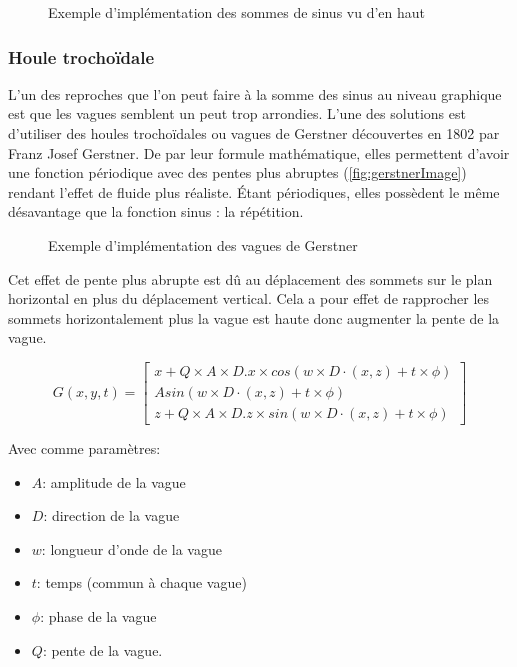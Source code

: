 \begin{figure}[H]			
	\caption{Exemple d'implémentation des sommes de sinus vu d'en haut}
	\label{fig:sumOfSineImage2}
\end{figure}
\pagebreak
\subsubsection{Houle trochoïdale}
L'un des reproches que l'on peut faire à la somme des sinus au niveau graphique est que les vagues semblent un peut trop arrondies. L'une des solutions est d'utiliser des houles trochoïdales ou vagues de Gerstner découvertes en 1802 par Franz Josef Gerstner\citep{gerstner}. De par leur formule mathématique, elles permettent d'avoir une fonction périodique avec des pentes plus abruptes (\autoref{fig:gerstnerImage}) rendant l'effet de fluide plus réaliste. Étant périodiques, elles possèdent le même désavantage que la fonction sinus : la répétition.

\begin{figure}[H]			
	\caption{Exemple d'implémentation des vagues de Gerstner}
	\label{fig:gerstnerImage}
\end{figure}

Cet effet de pente plus abrupte est dû au déplacement des sommets sur le plan horizontal en plus du déplacement vertical. Cela a pour effet de rapprocher les sommets horizontalement plus la vague est haute donc augmenter la pente de la vague.

\[G(x,y,t) =\begin{bmatrix}
	x + Q \times A \times D.x \times cos(w \times D \cdot (x,z) + t \times \phi)\\
	A sin(w \times D \cdot (x,z) + t \times \phi)\\
	z + Q \times A \times D.z \times sin(w \times D \cdot (x,z) + t \times \phi)
\end{bmatrix} \]


Avec comme paramètres:
\begin{itemize}
	\item $A$: amplitude de la vague
	\item $D$: direction de la vague
	\item $w$: longueur d'onde de la vague
	\item $t$: temps (commun à chaque vague)
	\item $\phi$: phase de la vague
	\item $Q$: pente de la vague.
\end{itemize}
\pagebreak

